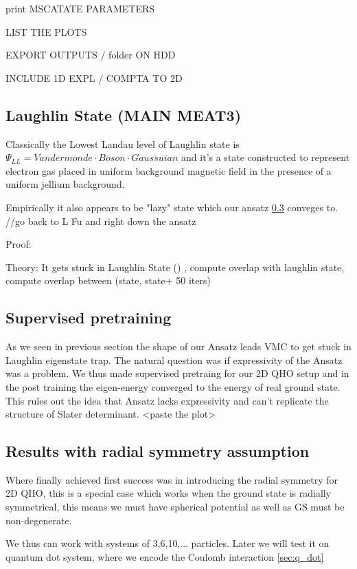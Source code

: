 \documentclass[a4paper,11pt,twoside]{article}
\begin{document}
print MSCATATE PARAMETERS 

LIST THE PLOTS 

EXPORT OUTPUTS / folder ON HDD 

INCLUDE 1D EXPL / COMPTA TO 2D



\subsection{Laughlin State (MAIN MEAT3)}

Classically the Lowest Landau level of Laughlin state is  $\Psi_{LL} = Vandermonde \cdot Boson \cdot Gaussuian  $
and it's a state constructed to represent electron gas placed in uniform background magnetic field in the presence of a uniform jellium background.  

Empirically it also appears to be "lazy" state which our ansatz \ref{} conveges to. //go back to L Fu and right down the ansatz 

Proof: 

Theory: It gets stuck in Laughlin State () , compute overlap with laughlin state, compute overlap between (state, state+ 50 iters) 

\subsection{Supervised pretraining}

As we seen in previous section the shape of our Ansatz leads VMC to get stuck in Laughlin eigenstate trap. The natural question was if expressivity of the Ansatz was a problem. We thus made supervised pretraing for our 2D QHO setup and in the post training the eigen-energy converged to the energy of real ground state. This rules out the idea that Ansatz lacks expressivity and can't replicate the structure of Slater determinant.
<paste the plot>

\subsection{Results with radial symmetry assumption}

Where finally achieved first success was in introducing the radial symmetry for 2D QHO, this is a special case which works when the ground state is  radially symmetrical, this means we must have spherical potential as well as GS must be non-degenerate. 

We thus can work with systems of 3,6,10,... particles. Later we will test it on quantum dot system, where we encode the Coulomb interaction \ref{sec:q_dot} 
\end{document}
